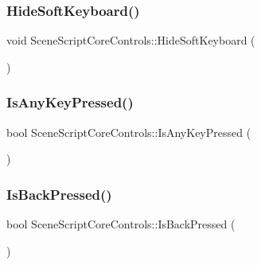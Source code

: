 \hypertarget{class_scene_script_core_controls_a03b7be269b85a550e8da3a12e8075112}{}\label{class_scene_script_core_controls_a03b7be269b85a550e8da3a12e8075112} 
\subsubsection{\texorpdfstring{Hide\+Soft\+Keyboard()}{HideSoftKeyboard()}}
{\footnotesize\ttfamily void Scene\+Script\+Core\+Controls\+::\+Hide\+Soft\+Keyboard (\begin{DoxyParamCaption}{ }\end{DoxyParamCaption})}

\hypertarget{class_scene_script_core_controls_abf2bbf131c6ea480d1fc7d9a5a839c16}{}\label{class_scene_script_core_controls_abf2bbf131c6ea480d1fc7d9a5a839c16} 
\subsubsection{\texorpdfstring{Is\+Any\+Key\+Pressed()}{IsAnyKeyPressed()}}
{\footnotesize\ttfamily bool Scene\+Script\+Core\+Controls\+::\+Is\+Any\+Key\+Pressed (\begin{DoxyParamCaption}{ }\end{DoxyParamCaption})}

\hypertarget{class_scene_script_core_controls_a03fdf8570dcc8be77c9c444956a122d3}{}\label{class_scene_script_core_controls_a03fdf8570dcc8be77c9c444956a122d3} 
\subsubsection{\texorpdfstring{Is\+Back\+Pressed()}{IsBackPressed()}}
{\footnotesize\ttfamily bool Scene\+Script\+Core\+Controls\+::\+Is\+Back\+Pressed (\begin{DoxyParamCaption}{ }\end{DoxyParamCaption})}

